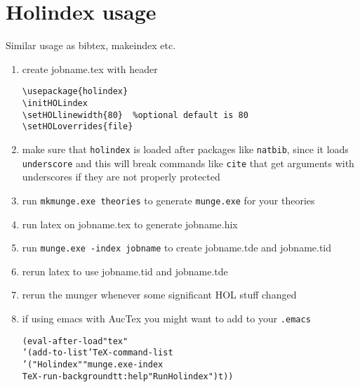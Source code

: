 \documentclass{scrartcl}
\begin{document}
\section{Holindex usage}

Similar usage as bibtex, makeindex etc.

\begin{enumerate}
\item create jobname.tex with header
\begin{verbatim}
\usepackage{holindex}
\initHOLindex
\setHOLlinewidth{80}  %optional default is 80
\setHOLoverrides{file}
\end{verbatim}
\item make sure that \texttt{holindex} is loaded after packages like
  \texttt{natbib}, since it loads \texttt{underscore} and this will
  break commands like \texttt{cite} that get arguments with
  underscores if they are not properly protected
\item run \texttt{mkmunge.exe theories} to generate \texttt{munge.exe}
  for your theories
\item run latex on jobname.tex to generate jobname.hix
\item run \texttt{munge.exe -index jobname} to create jobname.tde and jobname.tid
\item rerun latex to use jobname.tid and jobname.tde
\item rerun the munger whenever some significant HOL stuff changed
\item if using emacs with AucTex you might want to add to your \texttt{.emacs}
\begin{alltt}
(eval-after-load "tex"
  '(add-to-list 'TeX-command-list
    '("Holindex" "munge.exe -index %s" 
       TeX-run-background t t :help "Run Holindex") t))
\end{alltt}
\end{enumerate}
\end{document}
